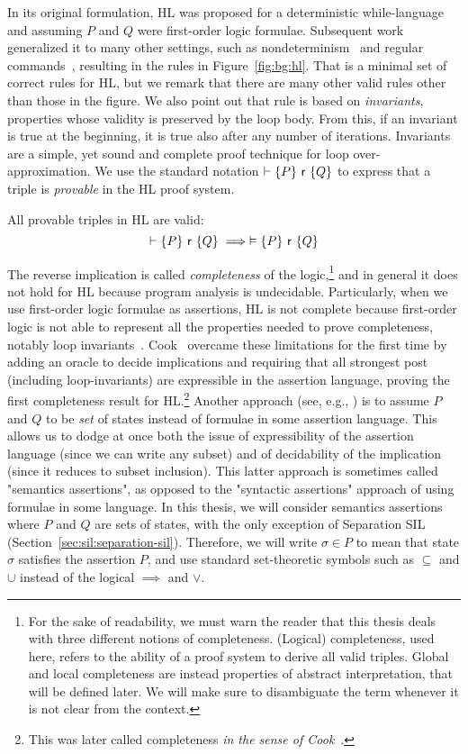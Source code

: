 In its original formulation, HL was proposed for a deterministic while-language and assuming $P$ and $Q$ were first-order logic formulae.
Subsequent work generalized it to many other settings, such as nondeterminism~\cite{Apt84} and regular commands~\cite{MOH21}, resulting in the rules in Figure~\ref{fig:bg:hl}.
That is a minimal set of correct rules for HL, but we remark that there are many other valid rules other than those in the figure. We also point out that rule  is based on \emph{invariants}, properties whose validity is preserved by the loop body. From this, if an invariant is true at the beginning, it is true also after any number of iterations. Invariants are a simple, yet sound and complete proof technique for loop over-approximation.
We use the standard notation $\vdash \{P\}~\mathsf{r}~\{Q\}$ to express that a triple is \emph{provable} in the HL proof system.

\begin{theorem}
	All provable triples in HL are valid:
	\[
	\vdash \{P\}~\mathsf{r}~\{Q\} \implies \vDash \{P\}~\mathsf{r}~\{Q\}
	\]
\end{theorem}

The reverse implication is called \emph{completeness} of the logic,\footnote{For the sake of readability, we must warn the reader that this thesis deals with three different notions of completeness. (Logical) completeness, used here, refers to the ability of a proof system to derive all valid triples. Global and local completeness are instead properties of abstract interpretation, that will be defined later. We will make sure to disambiguate the term whenever it is not clear from the context.} and in general it does not hold for HL because program analysis is undecidable. Particularly, when we use first-order logic formulae as assertions, HL is not complete because first-order logic is not able to represent all the properties needed to prove completeness, notably loop invariants~\cite[§2.7]{Apt81}.
Cook~\cite{Cook78} overcame these limitations for the first time by adding an oracle to decide implications and requiring that all strongest post (including loop-invariants) are expressible in the assertion language, proving the first completeness result for HL.\footnote{This was later called completeness \emph{in the sense of Cook}~\cite[§2.8]{Apt81}.}
Another approach (see, e.g., \cite{CCLB12,OHearn20,Zilberstein24}) is to assume $P$ and $Q$ to be \emph{set} of states instead of formulae in some assertion language. This allows us to dodge at once both the issue of expressibility of the assertion language (since we can write any subset) and of decidability of the implication (since it reduces to subset inclusion). This latter approach is sometimes called "semantics assertions", as opposed to the "syntactic assertions" approach of using formulae in some language.
In this thesis, we will consider semantics assertions where $P$ and $Q$ are sets of states, with the only exception of Separation SIL (Section~\ref{sec:sil:separation-sil}). Therefore, we will write $\sigma \in P$ to mean that state $\sigma$ satisfies the assertion $P$, and use standard set-theoretic symbols such as $\subseteq$ and $\cup$ instead of the logical $\implies$ and $\lor$.

